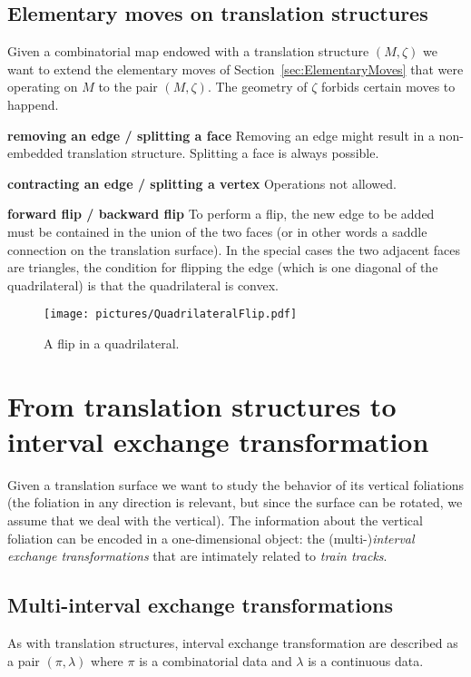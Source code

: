 \documentclass{article}
\begin{document}
\subsection{Elementary moves on translation structures}
Given a combinatorial map endowed with a translation structure $(M, \zeta)$
we want to extend the elementary moves of Section~\ref{sec:ElementaryMoves}
that were operating on $M$ to the pair $(M, \zeta)$. The geometry of $\zeta$
forbids certain moves to happend.

\textbf{removing an edge / splitting a face}
Removing an edge might result in a non-embedded translation structure.
Splitting a face is always possible.

\textbf{contracting an edge / splitting a vertex}
Operations not allowed.

\textbf{forward flip / backward flip}
To perform a flip, the new edge to be added must be contained in the union of
the two faces (or in other words a saddle connection on the translation surface).
In the special cases the two adjacent faces are triangles, the condition
for flipping the edge (which is one diagonal of the quadrilateral) is that the
quadrilateral is convex.
\begin{figure}[!ht]
\begin{center}\texttt{[image: pictures/QuadrilateralFlip.pdf]}\end{center}
\caption{A flip in a quadrilateral.}
\end{figure}

\section{From translation structures to interval exchange transformation}
Given a translation surface we want to study the behavior of its vertical foliations
(the foliation in any direction is relevant, but since the surface can be rotated,
we assume that we deal with the vertical). The information about the vertical
foliation can be encoded in a one-dimensional object: the 
(multi-)\emph{interval exchange transformations} that are intimately related
to \emph{train tracks}.

\subsection{Multi-interval exchange transformations}
As with translation structures, interval exchange transformation are described as
a pair $(\pi, \lambda)$ where $\pi$ is a combinatorial data and $\lambda$ is
a continuous data.
\end{document}
